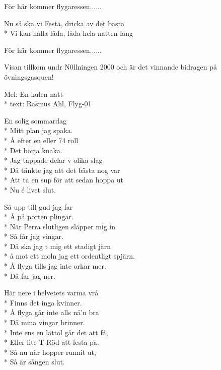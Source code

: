 \begin{SongText}
\begin{SongVerse}
        För här kommer flygaressen......
    \end{SongVerse}
    \begin{SongVerse}
        Nu så ska vi Festa, dricka av det bästa\\*%
        Vi kan hålla låda, låda hela natten lång
    \end{SongVerse}
    \begin{SongVerse}
        För här kommer flygaressen......
    \end{SongVerse}
    \begin{SongInfo}
        Visan tillkom undr N0llningen 2000 och är det vinnande bidragen på övningsgasquen!
    \end{SongInfo}
\end{SongText}
\begin{SongText}
    \begin{SongInfo}
        Mel: En kulen natt\\*%
        text: Rasmus Ahl, Flyg-01
    \end{SongInfo}
    \begin{SongVerse}
        En solig sommardag\\*%
        Mitt plan jag spaka.\\*%
        Å efter en eller 74 roll\\*%
        Det börja knaka.\\*%
        Jag tappade delar v olika slag\\*%
        Då tänkte jag att det bästa nog var\\*%
        Att ta en sup för att sedan hoppa ut\\*%
        Nu é livet slut.
    \end{SongVerse}
    \begin{SongVerse}
        Så upp till gud jag far\\*%
        Å på porten plingar.\\*%
        När Perra slutligen släpper mig in\\*%
        Så får jag vingar.\\*%
        Då ska jag t mig ett stadigt järn\\*%
        å mot ett moln jag ett ordentligt spjärn.\\*%
        Å flyga tills jag inte orkar mer.\\*%
        Då far jag ner.
    \end{SongVerse}
    \begin{SongVerse}
        Här nere i helvetets varma vrå\\*%
        Finns det inga kvinner.\\*%
        Å flyga går inte alls nå'n bra\\*%
        Då mina vingar brinner.\\*%
        Inte ens en lättöl går det att få,\\*%
        Eller lite T-Röd att festa på.\\*%
        Så nu när hopper runnit ut,\\*%
        Så är sången slut.
    \end{SongVerse}
\end{SongText}
